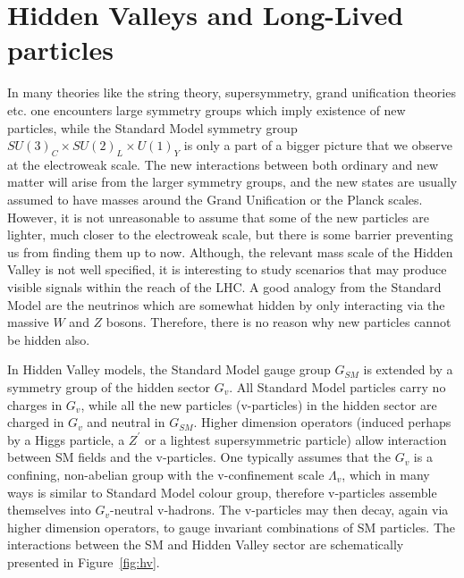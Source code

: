 \section{Hidden Valleys and Long-Lived particles}

In many theories like the string theory, supersymmetry, grand unification theories etc.
 one encounters large symmetry groups which imply existence of
new particles, while the Standard Model symmetry group $SU(3)_C \times SU(2)_L \times U(1)_Y$ 
 is only a part of a bigger picture that we observe at the electroweak scale.
The new interactions between
both ordinary and new matter will arise from the larger symmetry groups,  and  
the new states are usually
assumed to have masses around the Grand Unification or the Planck scales. However, it is not unreasonable
to assume that some of the new particles are lighter, much closer to the electroweak scale,
but there is some barrier preventing us from finding them up to now.
Although, the relevant mass scale of the Hidden Valley is not well
specified, it is interesting to study scenarios that may produce visible signals within 
the reach of the LHC.
A good analogy from the Standard Model are 
the neutrinos which are somewhat hidden by only interacting via the massive $W$ and $Z$ bosons.
Therefore, there is no reason why new particles cannot be hidden also. 

In Hidden Valley models, the Standard Model gauge group $G_{SM}$ is extended by a symmetry 
group of the hidden sector $G_v$. 
All Standard Model particles carry no charges in $G_v$, while
all the new particles (v-particles) in the hidden sector are charged in $G_v$ and neutral 
in $G_{SM}$. Higher dimension operators (induced perhaps by a Higgs particle, a $Z^{'}$ or
a lightest supersymmetric particle) allow interaction between SM fields and the v-particles.
One typically assumes that the $G_v$ is a confining, non-abelian group with the
v-confinement scale $\Lambda_v$, which in many ways is similar to Standard Model colour group,
therefore v-particles assemble themselves into $G_v$-neutral v-hadrons.
The v-particles may then decay, again via higher dimension operators, to gauge invariant 
combinations of SM particles. The interactions between the SM and Hidden Valley sector are
schematically presented in Figure~\ref{fig:hv}. 

